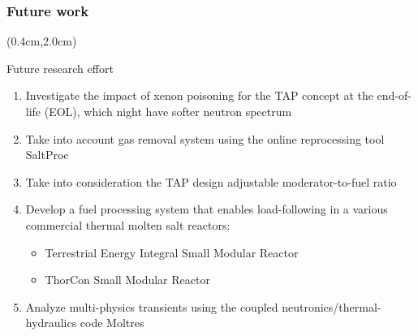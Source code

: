 \begin{frame}
\frametitle{Future work}
\begin{textblock*}{12cm}(0.4cm,2.0cm) %
	\begin{block}{Future research effort}
		\begin{enumerate}
		\itemsep=5mm
			\item Investigate the impact of xenon poisoning for the TAP 
			concept at the end-of-life (EOL), which night have softer neutron 
			spectrum
			\item Take into account gas removal system using the online 
			reprocessing tool SaltProc \cite{rykhlevskii_arfc/saltproc_2018, 
			rykhlevskii_modeling_2019}
			\item Take into consideration the \gls{TAP} design adjustable 
			moderator-to-fuel ratio
			\item Develop a fuel processing system that enables load-following 
			in a various commercial thermal molten salt reactors:
				\begin{itemize}
					\item Terrestrial Energy Integral Small Modular Reactor
					\item ThorCon Small Modular Reactor
				\end{itemize}
			\item Analyze multi-physics transients using the coupled 
			neutronics/thermal-hydraulics code Moltres 
			\cite{lindsay_introduction_2018}
		\end{enumerate}
	\end{block}
\end{textblock*}
\end{frame}

